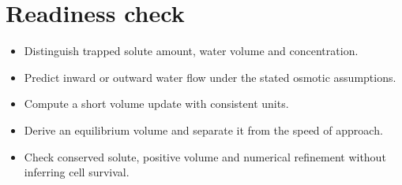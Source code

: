 \documentclass[11pt,letterpaper]{article}
\theoremstyle{definition}\newtheorem{definition}{Definition}\newtheorem{example}{Example}
\numberwithin{equation}{section}
\begin{document}
\section*{Readiness check}
\begin{itemize}
\item Distinguish trapped solute amount, water volume and concentration.
\item Predict inward or outward water flow under the stated osmotic assumptions.
\item Compute a short volume update with consistent units.
\item Derive an equilibrium volume and separate it from the speed of approach.
\item Check conserved solute, positive volume and numerical refinement without inferring cell survival.
\end{itemize}
\end{document}

